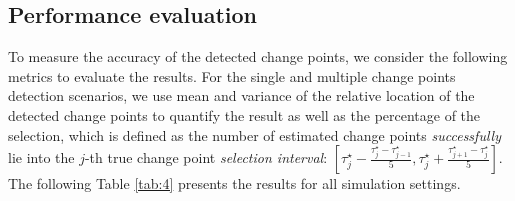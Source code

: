\documentclass[11pt]{article}
\begin{document}
\subsection{Performance evaluation}
To measure the accuracy of the detected change points, we consider the following metrics to evaluate the results. For the single and multiple change points detection scenarios, we use mean and variance of the relative location of the detected change points to quantify the result as well as the percentage of the selection, which is defined as the number of estimated change points \emph{successfully} lie into the $j$-th true change point \emph{selection interval}: $[\tau_j^\star - \frac{\tau_j^\star - \tau^\star_{j-1}}{5}, \tau_j^\star + \frac{\tau_{j+1}^\star - \tau_j^\star}{5}]$. The following Table \ref{tab:4} presents the results for all simulation settings.
\begin{table}[!ht]
    \caption{Performance for detecting single (S) and multiple (M) change points cases.}
    \label{tab:4}
\end{table}
\end{document}
